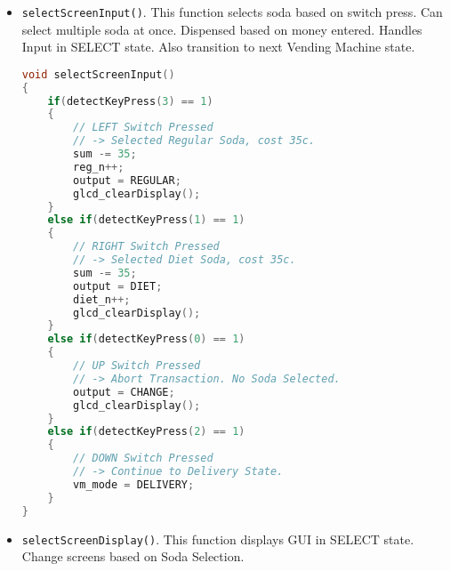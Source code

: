 \documentclass{article}
\begin{document}
\begin{itemize}
\begin{lstlisting}[basicstyle = \small, language = C]
        25c>Press HAT  Next>Press RIGHT", 4);
        input = NONEI;
        break;
    case DIME:
        // DIME input detected. Total Money 
        // Entered Displayed. Further provision 
        // to enter more coins.
        displayText(digits, 0);
        displayText("Entered
        5c>Press UP     10c>Press DOWN  25c>Press HAT
        Next>Press RIGHT", 1);
        break;
    case NICKEL:
        // NICKEL input detected. Total Money 
        // Entered Displayed. Further provision 
        // to enter more coins.
        displayText(digits, 0);
        displayText("Entered 
        5c>Press UP     10c>Press DOWN  25c>Press HAT
        Next>Press RIGHT", 1);
        break;
    case QUARTER:
        // QUARTER input detected. Total Money 
        // Entered Displayed. Further provision to enter 
        // more coins.
        displayText(digits, 0);
        displayText("Entered
        5c>Press UP     10c>Press DOWN  25c>Press HAT
        Next>Press RIGHT", 1);
        break;
    case NONEI:
        // No Input detected.
        break;
    }
}
  \end{lstlisting}
  \item \texttt{selectScreenInput()}. This function selects soda based on switch press. Can select multiple soda at once. Dispensed based on money entered. Handles Input in SELECT state. Also transition to next Vending Machine state.
      \begin{lstlisting}[basicstyle = \small, language = C]
void selectScreenInput()
{
    if(detectKeyPress(3) == 1)
    {
        // LEFT Switch Pressed 
        // -> Selected Regular Soda, cost 35c.
        sum -= 35;
        reg_n++;
        output = REGULAR;
        glcd_clearDisplay();
    }
    else if(detectKeyPress(1) == 1)
    {
        // RIGHT Switch Pressed 
        // -> Selected Diet Soda, cost 35c.
        sum -= 35;
        output = DIET;
        diet_n++;
        glcd_clearDisplay();
    }
    else if(detectKeyPress(0) == 1)
    {
        // UP Switch Pressed 
        // -> Abort Transaction. No Soda Selected.
        output = CHANGE;
        glcd_clearDisplay();
    }
    else if(detectKeyPress(2) == 1)
    {
        // DOWN Switch Pressed 
        // -> Continue to Delivery State.
        vm_mode = DELIVERY;
    }
}
  \end{lstlisting}
  \item \texttt{selectScreenDisplay()}. This function displays GUI in SELECT state. Change screens based on Soda Selection.
      \begin{lstlisting}[basicstyle = \small, language = C]

\end{lstlisting}
\end{itemize}
\end{document}
